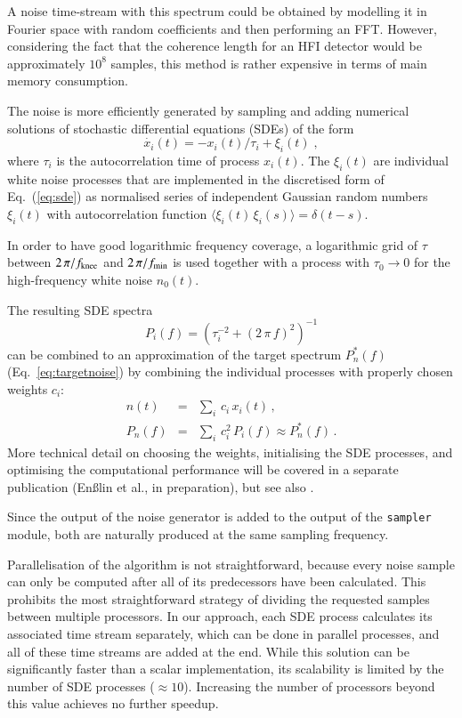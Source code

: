 \documentclass{aa}
\begin{document}
A noise time-stream with this spectrum could be obtained by modelling it
in Fourier space with random coefficients and then performing an
FFT. However, considering the fact that the coherence length for an
HFI detector would be approximately $10^8$ samples, this method is
rather expensive in terms of main memory consumption.

The noise is more efficiently generated by sampling and adding
numerical solutions of stochastic differential equations (SDEs) of the
form
\begin{equation}
\label{eq:sde}
  \dot{x_i}(t) = -x_i(t)/\tau_i + \xi_i(t)\;,
\end{equation}
where $\tau_i$  is the autocorrelation time of  process $x_i(t)$.  The
$\xi_i(t)$ are individual white  noise processes that are implemented
in the discretised form  of Eq.~(\ref{eq:sde}) as normalised series of
independent  Gaussian random  numbers $\xi_i(t)$  with autocorrelation
function $\langle \xi_i(t)\,\xi_i(s) \rangle = \delta(t-s)$.

In order to have good logarithmic frequency coverage, a logarithmic
grid of $\tau$ between $2\,\pi/f_{\rm knee}$ and $2\,\pi/f_{\rm min}$
is used together with a process with $\tau_0\rightarrow0$ for the
high-frequency white noise $n_0(t)$.

The resulting SDE spectra
\begin{equation}
  P_i(f) = \left(\tau_i^{-2} + (2\,\pi\,f)^2\right)^{-1}
\end{equation}
can be combined to an approximation of the target spectrum $P_n^*(f)$
(Eq.~\ref{eq:targetnoise}) by combining the individual processes with
properly chosen weights $c_i$:
\begin{eqnarray}
  n(t) &=& \sum_i\, c_i\, x_i(t)\,,\\
  P_n(f) &=& \sum_i\, c_i^2\, P_i(f) \approx P_n^*(f)\,.
\end{eqnarray}
More technical detail on choosing the weights, initialising the SDE
processes, and optimising the computational performance will be
covered in a separate publication (En{\ss}lin et al., in
preparation), but see also \cite{keihanen-etal-2005}.

Since the output of the noise generator is added to the output of the
{\tt sampler} module, both are naturally produced at the same sampling
frequency.

Parallelisation of the algorithm is not straightforward, because every
noise sample can only be computed after all of its predecessors have
been calculated.  This prohibits the most straightforward strategy of
dividing the requested samples between multiple processors. In our
approach, each SDE process calculates its associated time stream
separately, which can be done in parallel processes, and all of these
time streams are added at the end. While this solution can be
significantly faster than a scalar implementation, its scalability is
limited by the number of SDE processes ($\approx\!10$). Increasing the
number of processors beyond this value achieves no further speedup.
\end{document}

